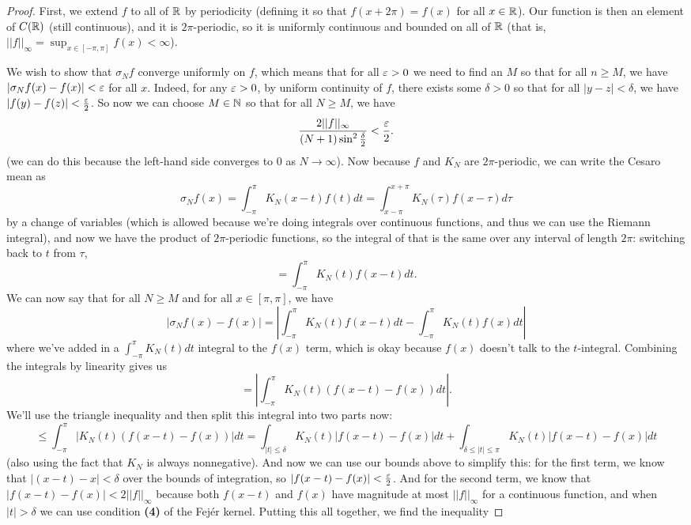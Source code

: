 \begin{proof}
First, we extend $f$ to all of $\mathbb R$ by periodicity (defining it so that $f(x + 2\pi) = f(x)$ for all $x \in \mathbb R$). Our function is then an element of $C(\mathbb R)$ (still continuous), and it is $2\pi$-periodic, so it is uniformly continuous and bounded on all of $\mathbb R$ (that is, $||f||_{\infty} = \sup_{x \in [-\pi, \pi]} f(x) < \infty$). 

We wish to show that $\sigma_N f$ converge uniformly on $f$, which means that for all $\varepsilon > 0$ we need to find an $M$ so that for all $n \ge M$, we have $|\sigma_N f(x) - f(x)| < \varepsilon$ for all $x$. Indeed, for any $\varepsilon > 0$, by uniform continuity of $f$, there exists some $\delta > 0$ so that for all $|y-z| < \delta$, we have $|f(y) - f(z)| < \frac{\varepsilon}{2}$. So now we can choose $M \in \mathbb N$ so that for all $N \ge M$, we have
\[
    \frac{2||f||_{\infty}}{(N+1) \sin^2\frac{\delta}{2}} < \frac{\varepsilon}{2}.
\]
(we can do this because the left-hand side converges to $0$ as $N \to \infty$). Now because $f$ and $K_N$ are $2\pi$-periodic, we can write the Cesaro mean as 
\[
    \sigma_N f(x) = \int_{-\pi}^{\pi} K_N(x-t) f(t) dt = \int_{x-\pi}^{x+\pi} K_N(\tau) f(x-\tau) d\tau
\]
by a change of variables (which is allowed because we're doing integrals over continuous functions, and thus we can use the Riemann integral), and now we have the product of $2\pi$-periodic functions, so the integral of that is the same over any interval of length $2\pi$: switching back to $t$ from $\tau$,
\[
    = \int_{-\pi}^{\pi} K_N(t) f(x-t) dt.
\]
We can now say that for all $N \ge M$ and for all $x \in [\pi, \pi]$, we have
\[
    |\sigma_N f(x) - f(x)| = \left|\int_{-\pi}^{\pi} K_N(t) f(x-t) dt - \int_{-\pi}^{\pi} K_N(t) f(x) dt\right|
\]
where we've added in a $\int_{-\pi}^{\pi} K_N(t) dt$ integral to the $f(x)$ term, which is okay because $f(x)$ doesn't talk to the $t$-integral. Combining the integrals by linearity gives us 
\[
    = \left|\int_{-\pi}^{\pi} K_N(t) \left(f(x-t) - f(x)\right) dt\right|.
\]
We'll use the triangle inequality and then split this integral into two parts now:
\[
    \le \int_{-\pi}^{\pi} \left| K_N(t) \left(f(x-t) - f(x)\right) \right| dt = \int_{|t| \le \delta} K_N(t) \left|f(x-t) - f(x)\right| dt + \int_{\delta \le |t| \le \pi} K_N(t) \left|f(x-t) - f(x)\right| dt
\]
(also using the fact that $K_N$ is always nonnegative). And now we can use our bounds above to simplify this: for the first term, we know that $|(x-t) - x| < \delta$ over the bounds of integration, so $|f(x-t) - f(x)| < \frac{\varepsilon}{2}$. And for the second term, we know that $|f(x-t) - f(x)| < 2||f||_{\infty}$ because both $f(x-t)$ and $f(x)$ have magnitude at most $||f||_{\infty}$ for a continuous function, and when $|t| > \delta$ we can use condition \textbf{(4)} of the Fej\'er kernel. Putting this all together, we find the inequality

\end{proof}
